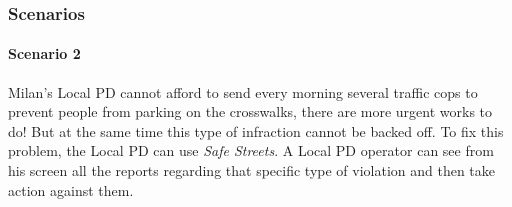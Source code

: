 \subsubsection{Scenarios}

\paragraph{Scenario 2}
Milan's Local PD cannot afford to send every morning several traffic cops to
prevent people from parking on the crosswalks, there are more urgent works to
do! But at the same time this type of infraction cannot be backed off. To fix
this problem, the Local PD can use \emph{Safe Streets}. A Local PD operator can
see from his screen all the reports regarding that specific type of violation
and then take action against them.